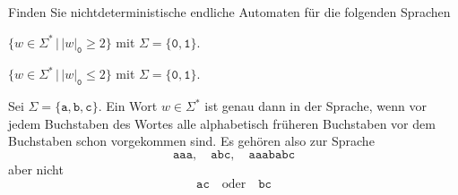 Finden Sie nichtdeterministische endliche Automaten für die folgenden
Sprachen
\begin{teilaufgaben}
\item
$\{w\in\Sigma^*\,|\, |w|_{\texttt{0}}\ge 2\}$ mit
$\Sigma=\{\texttt{0},\texttt{1}\}$.
\item
$\{w\in\Sigma^*\,|\, |w|_{\texttt{0}}\le 2\}$ mit
$\Sigma=\{\texttt{0},\texttt{1}\}$.
\item
Sei $\Sigma=\{\texttt{a},\texttt{b},\texttt{c}\}$.
Ein Wort $w\in\Sigma^*$ ist genau dann in der Sprache, wenn vor jedem
Buchstaben des Wortes alle alphabetisch früheren Buchstaben vor dem Buchstaben
schon vorgekommen sind.
Es gehören also zur Sprache
\[
\texttt{aaa},\quad
\texttt{abc},\quad
\texttt{aaababc}
\]
aber nicht
\[
\texttt{ac}
\quad\text{oder}\quad
\texttt{bc}
\]
\end{teilaufgaben}


